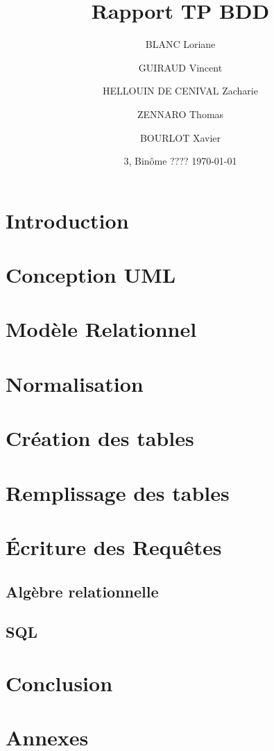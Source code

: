 \documentclass[french]{article}
\title{Rapport TP BDD}
\author{ BLANC Loriane \and GUIRAUD Vincent \and HELLOUIN DE CENIVAL Zacharie \and ZENNARO Thomas \and  BOURLOT Xavier}
\date{3\bsc{Imacs-ae-c}, Binôme ???? \bigbreak \today}
\begin{document}
\maketitle

\tableofcontents

\newpage

\section{Introduction}
\section{Conception UML}
\section{Modèle Relationnel}
\section{Normalisation}
\section{Création des tables}
\section{Remplissage des tables}
\section{Écriture des Requêtes}
\subsection{Algèbre relationnelle}
\subsection{SQL}
\section{Conclusion}

\newpage
\appendix
\section{Annexes}
\end{document}
